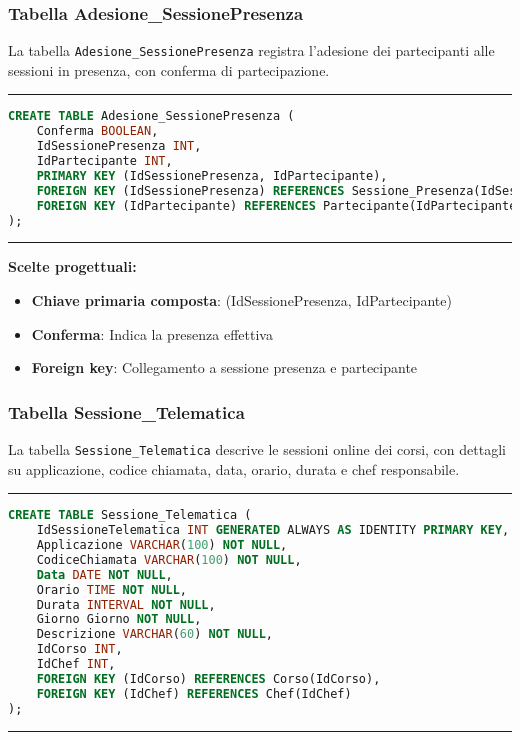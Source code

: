 \subsubsection{Tabella Adesione\_SessionePresenza}

La tabella \texttt{Adesione\_SessionePresenza} registra l'adesione dei partecipanti alle sessioni in presenza, con conferma di partecipazione.

\noindent\rule{\textwidth}{0.4pt}
\begin{lstlisting}[language=SQL, style=sqlstyle]
CREATE TABLE Adesione_SessionePresenza (
    Conferma BOOLEAN,
    IdSessionePresenza INT,
    IdPartecipante INT,
    PRIMARY KEY (IdSessionePresenza, IdPartecipante),
    FOREIGN KEY (IdSessionePresenza) REFERENCES Sessione_Presenza(IdSessionePresenza),
    FOREIGN KEY (IdPartecipante) REFERENCES Partecipante(IdPartecipante)
);
\end{lstlisting}
\noindent\rule{\textwidth}{0.4pt}

\textbf{Scelte progettuali:}
\begin{itemize}
    \item \textbf{Chiave primaria composta}: (IdSessionePresenza, IdPartecipante)
    \item \textbf{Conferma}: Indica la presenza effettiva
    \item \textbf{Foreign key}: Collegamento a sessione presenza e partecipante
\end{itemize}

\subsubsection{Tabella Sessione\_Telematica}

La tabella \texttt{Sessione\_Telematica} descrive le sessioni online dei corsi, con dettagli su applicazione, codice chiamata, data, orario, durata e chef responsabile.

\noindent\rule{\textwidth}{0.4pt}
\begin{lstlisting}[language=SQL, style=sqlstyle]
CREATE TABLE Sessione_Telematica (
    IdSessioneTelematica INT GENERATED ALWAYS AS IDENTITY PRIMARY KEY,
    Applicazione VARCHAR(100) NOT NULL,
    CodiceChiamata VARCHAR(100) NOT NULL,
    Data DATE NOT NULL,
    Orario TIME NOT NULL,
    Durata INTERVAL NOT NULL,
    Giorno Giorno NOT NULL,
    Descrizione VARCHAR(60) NOT NULL,
    IdCorso INT,
    IdChef INT,
    FOREIGN KEY (IdCorso) REFERENCES Corso(IdCorso),
    FOREIGN KEY (IdChef) REFERENCES Chef(IdChef)
);
\end{lstlisting}
\noindent\rule{\textwidth}{0.4pt}

